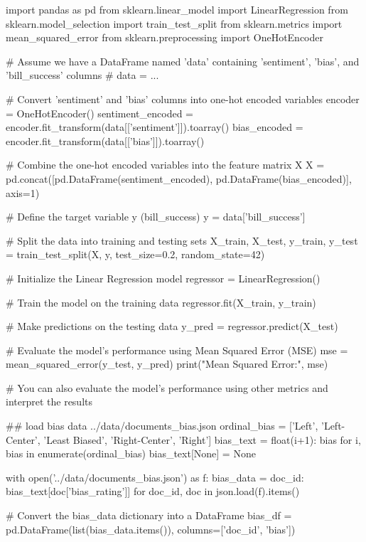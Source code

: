 \begin{pyin}
import pandas as pd
from sklearn.linear_model import LinearRegression
from sklearn.model_selection import train_test_split
from sklearn.metrics import mean_squared_error
from sklearn.preprocessing import OneHotEncoder

# Assume we have a DataFrame named 'data' containing 'sentiment', 'bias', and 'bill_success' columns
# data = ...

# Convert 'sentiment' and 'bias' columns into one-hot encoded variables
encoder = OneHotEncoder()
sentiment_encoded = encoder.fit_transform(data[['sentiment']]).toarray()
bias_encoded = encoder.fit_transform(data[['bias']]).toarray()

# Combine the one-hot encoded variables into the feature matrix X
X = pd.concat([pd.DataFrame(sentiment_encoded), pd.DataFrame(bias_encoded)], axis=1)

# Define the target variable y (bill_success)
y = data['bill_success']

# Split the data into training and testing sets
X_train, X_test, y_train, y_test = train_test_split(X, y, test_size=0.2, random_state=42)

# Initialize the Linear Regression model
regressor = LinearRegression()

# Train the model on the training data
regressor.fit(X_train, y_train)

# Make predictions on the testing data
y_pred = regressor.predict(X_test)

# Evaluate the model's performance using Mean Squared Error (MSE)
mse = mean_squared_error(y_test, y_pred)
print("Mean Squared Error:", mse)

# You can also evaluate the model's performance using other metrics and interpret the results

\end{pyin}


\begin{pyin}
\## load bias data ../data/documents_bias.json
ordinal_bias = ['Left', 'Left-Center', 'Least Biased', 'Right-Center', 'Right']
bias_text = {float(i+1): bias for i, bias in enumerate(ordinal_bias)}
bias_text[None] = None

with open('../data/documents_bias.json') as f:
    bias_data = {doc_id: bias_text[doc['bias_rating']] for doc_id, doc in json.load(f).items()}

# Convert the bias_data dictionary into a DataFrame
bias_df = pd.DataFrame(list(bias_data.items()), columns=['doc_id', 'bias'])
\end{pyin}

